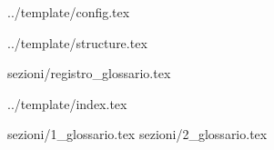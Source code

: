  {../template/config.tex}


\def\DOCUMENTO{Glossario}
\def\VERSIONE{1.0.0}

\def\DESCRIZIONE{Glossario contenente le definizioni degli acronimi e dei termini tecnici utilizzati nei documenti}

\def\REDATTORE {Federico Rossetto}
\def\VERIFICATORE {Riccardo Rizzo}
\def\RESPONSABILE {Enrico Chiara}

\def\USO {Esterno}

\def\DISTRIBUZIONE {\GRUPPO{}\\ & \COMMITTENTE{}\\}

\def\DESCRIZIONE {Glossario contenente le definizioni degli acronimi e dei termini tecnici utilizzati nei documenti}


\def\INDICE	{true}
\def\TABELLE {false}
\def\FIGURE {false}


 {../template/structure.tex}

 {sezioni/registro_glossario.tex}

 {../template/index.tex}

 {sezioni/1_glossario.tex}
 {sezioni/2_glossario.tex}





